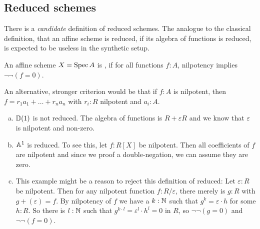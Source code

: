 
\subsection{Reduced schemes}

There is a \emph{candidate} definition of reduced schemes.
The analogue to the classical definition, that an affine scheme is reduced,
if its algebra of functions is reduced, is expected to be useless in the synthetic setup.

\begin{definition}
  An affine scheme $X=\operatorname{Spec} A$ is ,
  if for all functions $f:A$, nilpotency implies $\neg\neg (f=0)$.
\end{definition}

An alternative, stronger criterion would be that if $f : A$ is nilpotent, then
$f = r_1 a_1 + \ldots + r_n a_n$ with $r_i : R$ nilpotent and $a_i : A$.

\begin{example}
  \begin{enumerate}[(a)]
  \item $\mathbb{D}(1)$ is not reduced.
    The algebra of functions is $R+\varepsilon R$ and we know that $\varepsilon$ is nilpotent and non-zero.
  \item $\mathbb{A}^1$ is reduced. To see this, let $f:R[X]$ be nilpotent.
    Then all coefficients of $f$ are nilpotent and since we proof a double-negation,
    we can assume they are zero.
  \item This example might be a reason to reject this definition of reduced:
    Let $\varepsilon:R$ be nilpotent.
    Then for any nilpotent function $f:R/\varepsilon$, there merely is $g:R$ with $g+(\varepsilon)=f$.
    By nilpotency of $f$ we have a $k:\mathbb{N}$ such that $g^k=\varepsilon\cdot h$ for some $h:R$.
    So there is $l:\mathbb{N}$ such that $g^{k\cdot l}=\varepsilon^l\cdot h^l=0$ in $R$, so $\neg\neg (g=0)$ and $\neg\neg (f=0)$.
  \end{enumerate}
\end{example}

